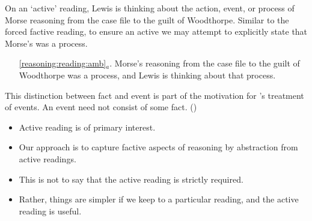 \documentclass[10pt]{article}
\begin{document}


On an `active' reading, Lewis is thinking about the action, event, or process of Morse reasoning from the case file to the guilt of Woodthorpe.
Similar to the forced factive reading, to ensure an active we may attempt to explicitly state that Morse's was a process.
\begin{enumerate}
\item[\ref{reasoning:reading:amb}\(_{a}\).] Morse's reasoning from the case file to the guilt of Woodthorpe was a process, and Lewis is thinking about that process.
\end{enumerate}



This distinction between fact and event is part of the motivation for \citeauthor{Davidson:2001aa}'s treatment of events.
An event need not consist of some fact.
(\citeyear[116]{Davidson:2001aa})

\begin{itemize}
\item Active reading is of primary interest.
\item Our approach is to capture factive aspects of reasoning by abstraction from active readings.
\item This is not to say that the active reading is strictly required.
\item Rather, things are simpler if we keep to a particular reading, and the active reading is useful.
\end{itemize}
\end{document}
